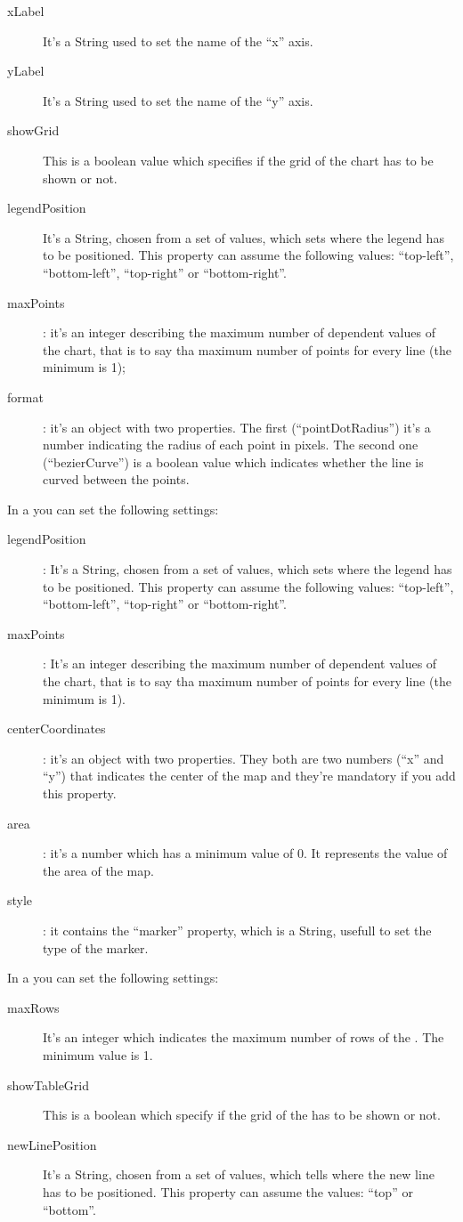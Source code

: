 			\begin{description}
				\item[xLabel] It's a String used to set the name of the “x” axis.
				\item[yLabel] It's a String used to set the name of the “y” axis.
				\item[showGrid] This is a boolean value which specifies if the grid of the chart has to be shown or not.
				\item[legendPosition] It's a String, chosen from a set of values, which sets where the legend has to be positioned. This property can assume the following values: “top-left”, “bottom-left”, “top-right” or “bottom-right”.
				\item[maxPoints]: it's an integer describing the maximum number of dependent values of the chart, that is to say tha maximum number of points for every line (the minimum is 1);
				\item[format]: it's an object with two properties. The first (“pointDotRadius”) it's a number indicating the radius of each point in pixels. The second one (“bezierCurve”) is a boolean value which indicates whether the line is curved between the points.
			\end{description}
			In a  you can set the following settings:
			\begin{description}
				\item[legendPosition]: It's a String, chosen from a set of values, which sets where the legend has to be positioned. This property can assume the following values: “top-left”, “bottom-left”, “top-right” or “bottom-right”.
				\item[maxPoints]: It's an integer describing the maximum number of dependent values of the chart, that is to say tha maximum number of points for every line (the minimum is 1).
				\item[centerCoordinates]: it's an object with two properties. They both are two numbers (“x” and “y”) that indicates the center of the map and they're mandatory if you add this property.
				\item[area]: it's a number which has a minimum value of 0. It represents the value of the area of the map.
				\item[style]: it contains the “marker” property, which is a String, usefull to set the type of the marker.
			\end{description}
			In a  you can set the following settings:
			\begin{description}
				\item[maxRows] It's an integer which indicates the maximum number of rows of the . The minimum value is 1.
				\item[showTableGrid] This is a boolean which specify if the grid of the  has to be shown or not.
				\item[newLinePosition] It's a String, chosen from a set of values, which tells where the new line has to be positioned. This property can assume the values: “top” or “bottom”.
			\end{description}


